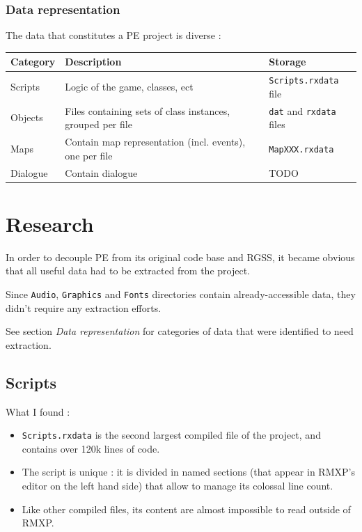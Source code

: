 \documentclass[11pt]{article}
\begin{document}
\newpage
\subsubsection{Data representation}

The data that constitutes a PE project is diverse :

\begin{tabular}{|L{.1\textwidth}|L{.52\textwidth}|L{.3\textwidth}|}
	\hline
	\textbf{Category} & \textbf{Description} & \textbf{Storage} \\
	\hline
	Scripts & Logic of the game, classes, ect & \verb|Scripts.rxdata| file \\
	\hline
	Objects & Files containing sets of class instances, grouped per file & \verb|dat| and \verb|rxdata| files \\
	\hline
	Maps & Contain map representation (incl. events), one per file & \verb|MapXXX.rxdata| \\
	\hline
	Dialogue & Contain dialogue & TODO \\
	\hline
\end{tabular}


\section{Research}

In order to decouple PE from its original code base and RGSS, it became obvious that all useful data had to be extracted from the project.

Since \verb|Audio|, \verb|Graphics| and \verb|Fonts| directories contain already-accessible data, they didn't require any extraction efforts.

See section \textit{Data representation} for categories of data that were identified to need extraction.


\subsection{Scripts}

What I found :
\begin{itemize}
	\item \verb|Scripts.rxdata| is the second largest compiled file of the project, and contains over 120k lines of code.
	
	\item The script is unique : it is divided in named sections (that appear in RMXP's editor on the left hand side) that allow to manage its colossal line count.
	
	\item Like other compiled files, its content are almost impossible to read outside of RMXP.
\end{itemize}
\end{document}
